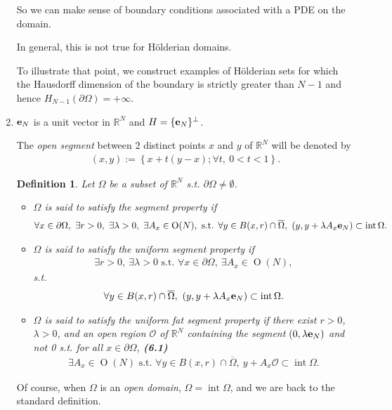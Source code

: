 \documentclass{book}
\numberwithin{equation}{section}
\newtheorem{definition}{Definition}[section]
\begin{document}
\begin{enumerate}
    So we can make sense of boundary conditions associated with a PDE on the domain.
    
    In general, this is not true for Hölderian domains.
    
    To illustrate that point, we construct examples of Hölderian sets for which the Hausdorff dimension of the boundary is strictly greater than $N - 1$ and hence $H_{N - 1}(\partial\Omega) = +\infty$.
    \item ${\bf e}_N$ is a unit vector in $\mathbb{R}^N$ and $H = \{{\bf e}_N\}^\bot$.
    
    The \textit{open segment} between 2 distinct points $x$ and $y$ of $\mathbb{R}^N$ will be denoted by
    \begin{align*}
        (x,y) := \left\{x + t\left(y - x\right);\forall t,\ 0 < t < 1\right\}.
    \end{align*}
    
    \begin{definition}
        Let $\Omega$ be a subset of $\mathbb{R}^N$ s.t. $\partial\Omega\ne\emptyset$.
        \begin{itemize}
            \item[(i)] $\Omega$ is said to satisfy the \emph{segment property} if
            \begin{align*}
                \forall x\in\partial\Omega,\ \exists r > 0,\ \exists\lambda > 0,\ \exists A_x\in\operatorname{O}(N), \mbox{ s.t. } \forall y\in B(x,r)\cap\overline{\Omega},\ \left(y,y + \lambda A_x{\bf e}_N\right)\subset\operatorname{int}\Omega.
            \end{align*}
            \item[(ii)] $\Omega$ is said to satisfy the \emph{uniform segment property} if
            \begin{align*}
                \exists r > 0,\ \exists\lambda > 0 \mbox{ s.t. } \forall x\in\partial\Omega,\ \exists A_x\in\operatorname{O}(N),
            \end{align*}
            s.t.
            \begin{align*}
                \forall y\in B(x,r)\cap\overline{\Omega},\ \left(y,y + \lambda A_x{\bf e}_N\right)\subset\operatorname{int}\Omega.
            \end{align*}
            \item[(iii)] $\Omega$ is said to satisfy the \emph{uniform fat segment property} if there exist $r > 0$, $\lambda > 0$, and an open region $\mathcal{O}$ of $\mathbb{R}^N$ containing the segment $(0,\lambda {\bf e}_N)$ and not 0 s.t. for all $x\in\partial\Omega$, \textbf{(6.1)}
            \begin{align*}
                \exists A_x\in\operatorname{O}(N) \mbox{ s.t. }\forall y\in B(x,r)\cap\overline{\Omega},\ y + A_x\mathcal{O}\subset\operatorname{int}\Omega.
            \end{align*}
        \end{itemize}
    \end{definition}
    Of course, when $\Omega$ is an \textit{open domain}, $\Omega = \operatorname{int}\Omega$, and we are back to the standard definition.
    

\end{enumerate}
\end{document}
